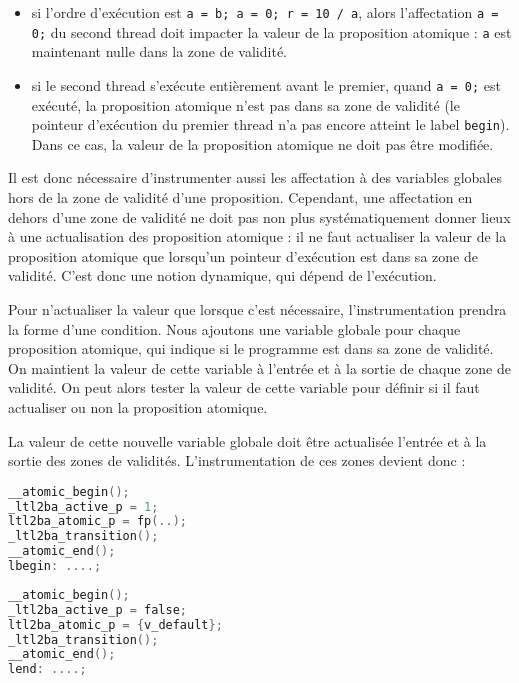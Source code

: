 \begin{itemize}
\item
  si l'ordre d'exécution est \texttt{a = b; a = 0; r = 10 / a}, alors
  l'affectation \texttt{a = 0;} du second thread doit impacter la
  valeur de la proposition atomique : \texttt{a} est maintenant nulle
  dans la zone de validité.
\item
  si le second thread s'exécute entièrement avant le premier, quand
  \texttt{a = 0;} est exécuté, la proposition atomique n'est pas dans
  sa zone de validité (le pointeur d'exécution du premier thread n'a pas
  encore atteint le label \texttt{begin}). Dans ce cas, la valeur de
  la proposition atomique ne doit pas être modifiée.
\end{itemize}

Il est donc nécessaire d'instrumenter aussi les affectation à des
variables globales hors de la zone de validité d'une proposition.
Cependant, une affectation en dehors d'une zone de validité ne doit pas
non plus systématiquement donner lieux à une actualisation des
proposition atomique : il ne faut actualiser la valeur de la proposition
atomique que lorsqu'un pointeur d'exécution est dans sa zone de
validité. C'est donc une notion dynamique, qui dépend de l'exécution.

Pour n'actualiser la valeur que lorsque c'est nécessaire,
l'instrumentation prendra la forme d'une condition. Nous ajoutons une
variable globale pour chaque proposition atomique, qui indique si le
programme est dans sa zone de validité. On maintient la valeur de cette
variable à l'entrée et à la sortie de chaque zone de validité. On peut
alors tester la valeur de cette variable pour définir si il faut
actualiser ou non la proposition atomique.

La valeur de cette nouvelle variable globale doit être actualisée
l'entrée et à la sortie des zones de validités. L'instrumentation de ces
zones devient donc :

\noindent\begin{minipage}{.45\textwidth}
\begin{lstlisting}[language=C, frame=single, caption=Entrée de zone de validité (2),
  label=lst:instr_in2]
__atomic_begin();
_ltl2ba_active_p = 1;
ltl2ba_atomic_p = fp(..);
_ltl2ba_transition();
__atomic_end();
lbegin: ....;
\end{lstlisting}
\end{minipage}\hfill
\begin{minipage}{.45\textwidth}
\begin{lstlisting}[language=C, frame=single, caption=Sortie de zone de validité (2),
  label=lst:instr_out2]
__atomic_begin();
_ltl2ba_active_p = false;
ltl2ba_atomic_p = {v_default};
_ltl2ba_transition();
__atomic_end();
lend: ....;
\end{lstlisting}
\end{minipage}

